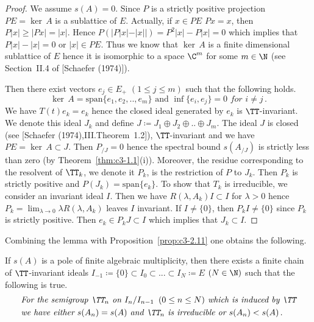 \begin{proof}
	We assume $s(A) = 0$. 
	Since $P$ is a strictly positive projection $PE = \ker\,A$ is a sublattice of $E$. 
	Actually, if $x \in PE$ \ie  $Px = x$, then $P|x| \geq |Px| = |x|$. 
	Hence $P(|P|x|-|x||) = P^{2}|x| - P|x| = 0$ which implies that $P|x| - |x| = 0$ or $|x| \in PE$.
	Thus we know that $\ker\,A$ is a finite dimensional sublattice of $E$ hence it is isomorphic to a space $\C ^{m}$ for some $m \in \N$ (see Section~II.4 of [Schaefer (1974)]). 
	
	Then there exist vectors $e_{j} \in E_{+}$ $(1\leq j\leq m)$ such that the following holds.
	\begin{equation}\label{eq:c3-3.18}
		\ker\,A = \mathrm{span} \{e_{1},e_{2}, .. ,e_{m}\} \text{ and } \inf\{e_{i},e_{j}\} = 0 \textit{ for }  i \neq j\,.
	\end{equation}
	We have $T(t)e_{k} = e_{k}$ hence the closed ideal generated by $e_{k}$ is $\TT$-invariant. 
	We denote this ideal $J_{k}$ and define $J\coloneqq  J_{1}\oplus J_{2}\oplus .. \oplus J_{m}$.
	The ideal $J$ is closed (see [Schaefer (1974),III.Theorem~1.2]), $\TT$-invariant and we have $PE = \ker\,A \subset J$. 
	Then $P_{/J} = 0$ hence the spectral bound $s(A_{/J})$
%
	is strictly less than zero (by Theorem~\ref{thm:c3-1.1}(i)). 
	Moreover, the residue corresponding to the resolvent of $\TT_{k}$, we denote it $P_{k}$, is the restriction of $P$ to $J_{k}$.
	Then $P_{k}$ is strictly positive and $P(J_{k}) = \mathrm{span}\{e_{k}\}$. 
	To show that $T_{k}$ is irreducible, we consider an invariant ideal $I$. 
	Then we have $R(\lambda,A_{k})I \subset I$ for $\lambda > 0$ hence $P_{k} = \lim_{\lambda \to 0}\lambda R(\lambda,A_{k})$ leaves $I$ invariant. 
	If $I \neq \{0\}$, then $P_{k}I \neq \{0\}$ since $P_{k}$ is strictly positive. 
	Then $e_{k} \in P_{k}J \subset I$ which implies that $J_{k} \subset I$.
\end{proof}

Combining the lemma with Proposition~\ref{prop:c3-2.11} one obtains the following.

If $s(A)$ is a pole of finite algebraic multiplicity, then there exists a finite chain of $\TT$-invariant ideals $I_{-1} \coloneqq  \{0\} \subset I_{0}\subset ... \subset I_{N} \coloneqq  E$ $(N\in\N)$ such that the following is true.
\begin{equation}\label{eq:c3-3.19}
	\begin{aligned}
	&\textit{For the semigroup $\TT_{n}$ on $I_{n}/I_{n-1}\, \ (0 \leq n \leq N)$ which is induced by $\TT$}
		\\
	& \textit{we have either $s(A_{n}) = s(A)$ and $\TT_{n}$ is irreducible or $s(A_{n}) < s(A)$}\,.
	\end{aligned}
\end{equation}

